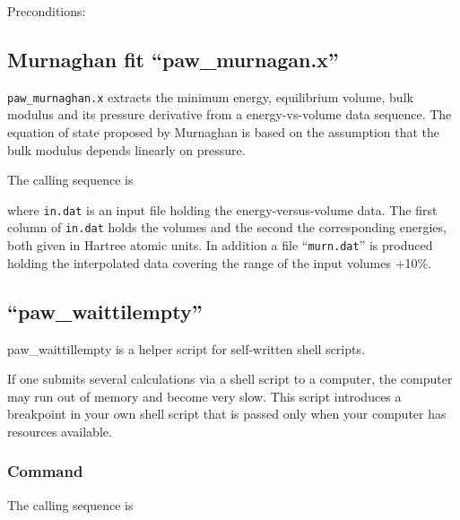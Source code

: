 \documentclass[final,12pt]{article}
\begin{document}
{{{{{{\noindent Preconditions:\\[2mm]
\hspace*{1cm}
\bigskip


\subsection{Murnaghan fit ``paw\_murnagan.x''}
{\tt paw\_murnaghan.x} extracts the minimum energy, equilibrium
volume, bulk modulus and its pressure derivative from a
energy-vs-volume data sequence. The equation of state proposed by
Murnaghan\cite{murnaghan44_pnas30_244} is based on the assumption that
the bulk modulus depends linearly on pressure.

The calling sequence is

\bigskip{}\bigskip

where {\tt in.dat} is an input file holding the energy-versus-volume
data.  The first column of {\tt in.dat} holds the volumes and the
second the corresponding energies, both given in Hartree atomic
units. In addition a file ``{\tt murn.dat}'' is produced holding the
interpolated data covering the range of the input volumes +10\%.
%
\subsection{``paw\_waittilempty''}
paw\_waittillempty is a helper script for self-written shell scripts.

If one submits several calculations via a shell script to a computer, the
computer may run out of memory and become very slow. This script
introduces a breakpoint in your own shell script that is passed only
when your computer has resources available.

\subsubsection{Command}
The calling sequence is

}}}}}}
\end{document}
